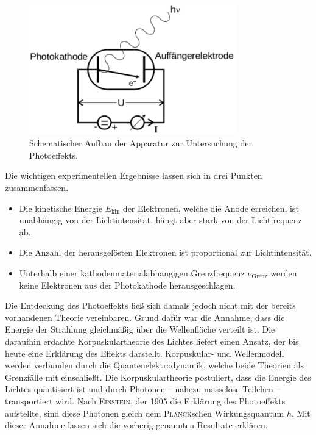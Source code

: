 \begin{figure}
	\centering
	\includegraphics[width=0.8\textwidth]{Bilder/schematischer_Aufbau.pdf}
	\caption{Schematischer Aufbau der Apparatur zur Untersuchung der Photoeffekts. \cite{skript}}
	\label{fig:schematischer Aufbau}
\end{figure}
\newpage
Die wichtigen experimentellen Ergebnisse lassen sich in drei Punkten zusammenfassen.
\begin{itemize}
	\item Die kinetische Energie $E_\mathup{kin}$ der Elektronen, welche die Anode erreichen, ist unabhängig von der Lichtintensität, hängt aber stark von der Lichtfrequenz ab.
	\item Die Anzahl der herausgelösten Elektronen ist proportional zur Lichtintensität.
	\item Unterhalb einer kathodenmaterialabhängigen Grenzfrequenz $\nu_\mathup{Grenz}$ werden keine Elektronen aus der Photokathode herausgeschlagen.
\end{itemize}

Die Entdeckung des Photoeffekts ließ sich damals jedoch nicht mit der bereits vorhandenen Theorie vereinbaren.
 Grund dafür war die Annahme, dass die Energie der Strahlung gleichmäßig über die Wellenfläche verteilt ist.
Die daraufhin erdachte Korpuskulartheorie des Lichtes liefert einen Ansatz, der bis heute eine Erklärung des Effekts darstellt. Korpuskular- und Wellenmodell werden verbunden durch die Quantenelektrodynamik, welche beide Theorien als Grenzfälle mit einschließt. 
Die Korpuskulartheorie postuliert, dass die Energie des Lichtes quantisiert ist und durch Photonen -- nahezu masselose Teilchen -- transportiert wird. 
Nach \textsc{Einstein}, der 1905 die Erklärung des Photoeffekts aufstellte, sind diese Photonen gleich dem \textsc{Planck}schen Wirkungsquantum $h$. 
Mit dieser Annahme lassen sich die vorherig genannten Resultate erklären.

